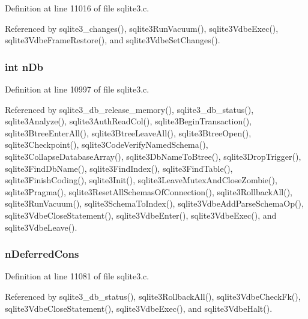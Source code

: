 Definition at line 11016 of file sqlite3.\+c.



Referenced by sqlite3\+\_\+changes(), sqlite3\+Run\+Vacuum(), sqlite3\+Vdbe\+Exec(), sqlite3\+Vdbe\+Frame\+Restore(), and sqlite3\+Vdbe\+Set\+Changes().

\hypertarget{structsqlite3_a231f892e0d997c2ad6333f6e599f7bbc}{}
\subsubsection[{n\+Db}]{\setlength{\rightskip}{0pt plus 5cm}int n\+Db}\label{structsqlite3_a231f892e0d997c2ad6333f6e599f7bbc}


Definition at line 10997 of file sqlite3.\+c.



Referenced by sqlite3\+\_\+db\+\_\+release\+\_\+memory(), sqlite3\+\_\+db\+\_\+status(), sqlite3\+Analyze(), sqlite3\+Auth\+Read\+Col(), sqlite3\+Begin\+Transaction(), sqlite3\+Btree\+Enter\+All(), sqlite3\+Btree\+Leave\+All(), sqlite3\+Btree\+Open(), sqlite3\+Checkpoint(), sqlite3\+Code\+Verify\+Named\+Schema(), sqlite3\+Collapse\+Database\+Array(), sqlite3\+Db\+Name\+To\+Btree(), sqlite3\+Drop\+Trigger(), sqlite3\+Find\+Db\+Name(), sqlite3\+Find\+Index(), sqlite3\+Find\+Table(), sqlite3\+Finish\+Coding(), sqlite3\+Init(), sqlite3\+Leave\+Mutex\+And\+Close\+Zombie(), sqlite3\+Pragma(), sqlite3\+Reset\+All\+Schemas\+Of\+Connection(), sqlite3\+Rollback\+All(), sqlite3\+Run\+Vacuum(), sqlite3\+Schema\+To\+Index(), sqlite3\+Vdbe\+Add\+Parse\+Schema\+Op(), sqlite3\+Vdbe\+Close\+Statement(), sqlite3\+Vdbe\+Enter(), sqlite3\+Vdbe\+Exec(), and sqlite3\+Vdbe\+Leave().

\hypertarget{structsqlite3_a6b3aed744956e6be8b2fce22bfd2b872}{}
\subsubsection[{n\+Deferred\+Cons}]{ n\+Deferred\+Cons}\label{structsqlite3_a6b3aed744956e6be8b2fce22bfd2b872}


Definition at line 11081 of file sqlite3.\+c.



Referenced by sqlite3\+\_\+db\+\_\+status(), sqlite3\+Rollback\+All(), sqlite3\+Vdbe\+Check\+Fk(), sqlite3\+Vdbe\+Close\+Statement(), sqlite3\+Vdbe\+Exec(), and sqlite3\+Vdbe\+Halt().

